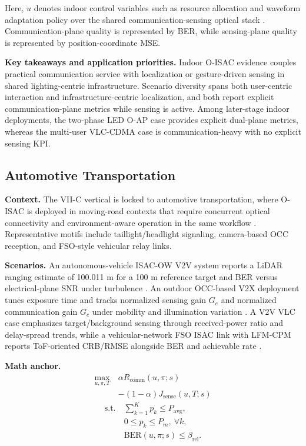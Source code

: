 \documentclass[lettersize,journal]{IEEEtran}
\begin{document}
Here, $u$ denotes indoor control variables such as resource allocation and waveform adaptation policy over the shared communication-sensing optical stack \cite{O_ISAC_108,O_ISAC_388}. Communication-plane quality is represented by BER, while sensing-plane quality is represented by position-coordinate MSE.

\textbf{Key takeaways and application priorities.} Indoor O-ISAC evidence couples practical communication service with localization or gesture-driven sensing in shared lighting-centric infrastructure. Scenario diversity spans both user-centric interaction and infrastructure-centric localization, and both report explicit communication-plane metrics while sensing is active. Among later-stage indoor deployments, the two-phase LED O-AP case provides explicit dual-plane metrics, whereas the multi-user VLC-CDMA case is communication-heavy with no explicit sensing KPI.

\subsection{Automotive Transportation}

\textbf{Context.} The VII-C vertical is locked to automotive transportation, where O-ISAC is deployed in moving-road contexts that require concurrent optical connectivity and environment-aware operation in the same workflow \cite{O_ISAC_003,O_ISAC_060,O_ISAC_164}. Representative motifs include taillight/headlight signaling, camera-based OCC reception, and FSO-style vehicular relay links.

\textbf{Scenarios.} An autonomous-vehicle ISAC-OW V2V system reports a LiDAR ranging estimate of 100.011 m for a 100 m reference target and BER versus electrical-plane SNR under turbulence \cite{O_ISAC_060}. An outdoor OCC-based V2X deployment tunes exposure time and tracks normalized sensing gain $G_e$ and normalized communication gain $G_c$ under mobility and illumination variation \cite{O_ISAC_164}. A V2V VLC case emphasizes target/background sensing through received-power ratio and delay-spread trends, while a vehicular-network FSO ISAC link with LFM-CPM reports ToF-oriented CRB/RMSE alongside BER and achievable rate \cite{O_ISAC_003,O_ISAC_055}.

\textbf{Math anchor.}
\begin{equation}
\begin{split}
\max_{u,\pi,T}\ &\alpha R_{\mathrm{comm}}(u,\pi;s)\\
&-(1-\alpha)J_{\mathrm{sense}}(u,T;s)
\end{split}
\end{equation}
\begin{equation}
\begin{split}
\text{s.t.}\ &\sum_{k=1}^{K} p_k \le P_{\mathrm{avg}},\\
&0 \le p_k \le P_m,\ \forall k,\\
&\mathrm{BER}(u,\pi;s)\le \beta_{\mathrm{rel}}.
\end{split}
\end{equation}
\end{document}
